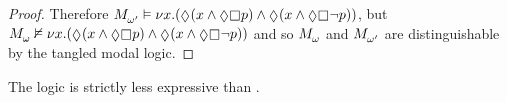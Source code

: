 \begin{proof}
Therefore $\kPModel{\omega'} \entails \gfp{\varX} (\possible (\varX \land \possible \necessary \atomP) \land \possible (\varX \land \possible \necessary \neg \atomP))$, 
but $\kPModel{\omega} \nentails \gfp{\varX} (\possible (\varX \land \possible \necessary \atomP) \land \possible (\varX \land \possible \necessary \neg \atomP))$
and so $\kPModel{\omega}$ and $\kPModel{\omega'}$ are distinguishable by the tangled modal logic.

\end{proof}

\begin{corollary}
The logic \logicRmlKF{} is strictly less expressive than \logicMuKF{}.
\end{corollary}

